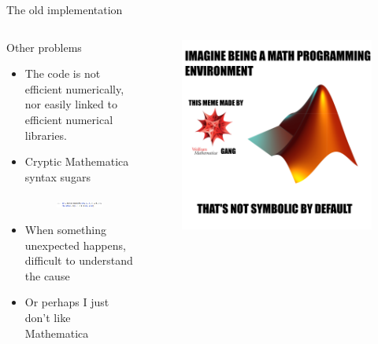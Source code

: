 \documentclass[11pt,aspectratio=169]{beamer}
\begin{document}
\begin{frame}{The old implementation}
	\begin{columns}
	\begin{column}{.46\linewidth}
		Other problems
		\begin{itemize}
			\item The code is not efficient numerically, nor easily linked to efficient numerical libraries.
			\item Cryptic Mathematica syntax sugars
			\begin{figure}
				\centering
				\includegraphics[width=.9\linewidth]{elements/Mathematica_snippet_3.png}
			\end{figure}
			\item When something unexpected happens, difficult to understand the cause
			\item Or perhaps I just don't like Mathematica
		\end{itemize}
	\end{column}
	\begin{column}{.46\linewidth}
		\begin{figure}
			\centering
			\includegraphics[width=\linewidth]{elements/mathematica_matlab_meme.png}
		\end{figure}
	\end{column}
	\end{columns}
\end{frame}
\end{document}
